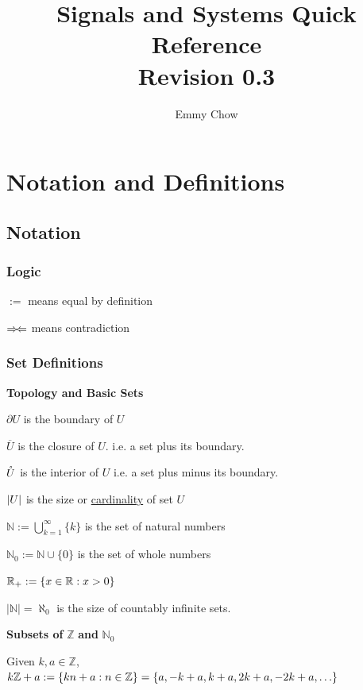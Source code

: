\documentclass[11pt]{article}
\title{Signals and Systems Quick Reference \\ Revision 0.3}
\author{Emmy Chow}
\date{}
\begin{document}
  \maketitle
  \tableofcontents

  \pagebreak

  \section{Notation and Definitions}

  \subsection{Notation}

  \subsubsection{Logic}

  \(:= \) means equal by definition

  \(\Rightarrow\!\Leftarrow\) means contradiction
  \subsubsection{Set Definitions}

  \textbf{Topology and Basic Sets}

  \(\partial U\) is the boundary of \(U\)

  \(\overbar{U}\) is the closure of \(U\). i.e. a set plus its boundary.

  \(\mathring{U}\) is the interior of \(U\) i.e. a set plus minus its boundary.

  \(\left|U\right|\) is the size or \href{https://brilliant.org/wiki/cardinality/}{cardinality} of set \(U\)

  \(\mathbb{N} := \displaystyle \bigcup_{k = 1}^{\infty} \{k\}\) is the set of natural numbers

  \(\mathbb{N}_0 := \mathbb{N} \cup \{0\}\) is the set of whole numbers

  \(\mathbb{R}_{+} := {\left\{ x \in \mathbb{R} : x > 0 \right\}}\)

  \(|\mathbb{N}| = \aleph_0\) is the size of countably infinite sets.

  \textbf{Subsets of} \(\mathbb{Z}\) \textbf{and} \(\mathbb{N}_0\)

  Given \(k, a \in \mathbb{Z}\),
  \(k\mathbb{Z} + a:= \brc{kn + a : n \in \mathbb{Z}} = \brc{a, -k + a, k + a, 2k + a, -2k + a, \dots}\)
\end{document}

